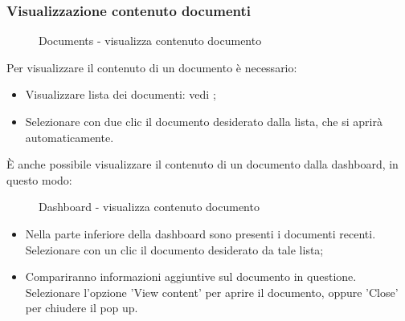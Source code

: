\documentclass[10pt, a4paper]{article}
\begin{document}
\subsubsection{Visualizzazione contenuto documenti}
\begin{figure}[H]
    \centering  
    \caption{Documents - visualizza contenuto documento}
    \label{img:visDoc}
\end{figure}
Per visualizzare il contenuto di un documento è necessario:
\begin{itemize}
    \item Visualizzare lista dei documenti: vedi ;
    \item Selezionare con due clic il documento desiderato dalla lista, che si aprirà automaticamente.
\end{itemize}
È anche possibile visualizzare il contenuto di un documento dalla dashboard, in questo modo:
\begin{figure}[H]
    \centering  
    \caption{Dashboard - visualizza contenuto documento}
    \label{img:visDash}
\end{figure}
\begin{itemize}
    \item Nella parte inferiore della dashboard sono presenti i documenti recenti. Selezionare con un clic il documento desiderato da tale lista;
    \item Compariranno informazioni aggiuntive sul documento in questione. Selezionare l'opzione 'View content' per aprire il documento, oppure 'Close' per chiudere il pop up.
\end{itemize}
\end{document}
